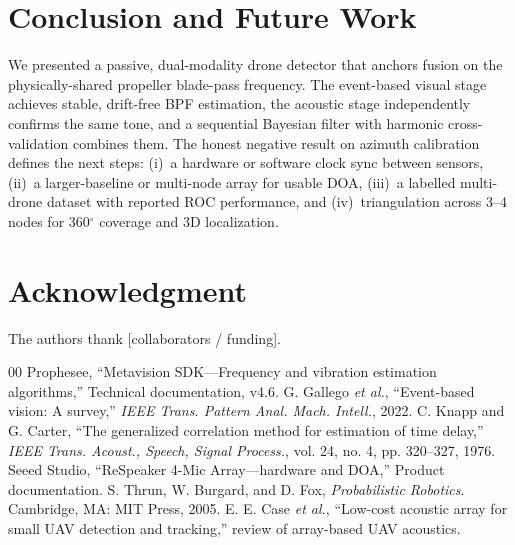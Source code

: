 \documentclass[conference]{IEEEtran}
\begin{document}
\section{Conclusion and Future Work}
We presented a passive, dual-modality drone detector that anchors fusion on
the physically-shared propeller blade-pass frequency. The event-based visual
stage achieves stable, drift-free BPF estimation, the acoustic stage
independently confirms the same tone, and a sequential Bayesian filter with
harmonic cross-validation combines them. The honest negative result on azimuth
calibration defines the next steps: (i)~a hardware or software clock sync
between sensors, (ii)~a larger-baseline or multi-node array for usable DOA,
(iii)~a labelled multi-drone dataset with reported ROC performance, and
(iv)~triangulation across 3--4 nodes for 360$^{\circ}$ coverage and 3D
localization.

\section*{Acknowledgment}
The authors thank [collaborators / funding].

\begin{thebibliography}{00}
 Prophesee, ``Metavision SDK---Frequency and vibration
estimation algorithms,'' Technical documentation, v4.6.
 G. Gallego \emph{et al.}, ``Event-based vision: A
survey,'' \emph{IEEE Trans. Pattern Anal. Mach. Intell.}, 2022.
 C. Knapp and G. Carter, ``The generalized correlation
method for estimation of time delay,'' \emph{IEEE Trans. Acoust., Speech,
Signal Process.}, vol. 24, no. 4, pp. 320--327, 1976.
 Seeed Studio, ``ReSpeaker 4-Mic Array---hardware and
DOA,'' Product documentation.
 S. Thrun, W. Burgard, and D. Fox, \emph{Probabilistic
Robotics}. Cambridge, MA: MIT Press, 2005.
 E. E. Case \emph{et al.}, ``Low-cost acoustic array for
small UAV detection and tracking,'' review of array-based UAV acoustics.
\end{thebibliography}
\end{document}

